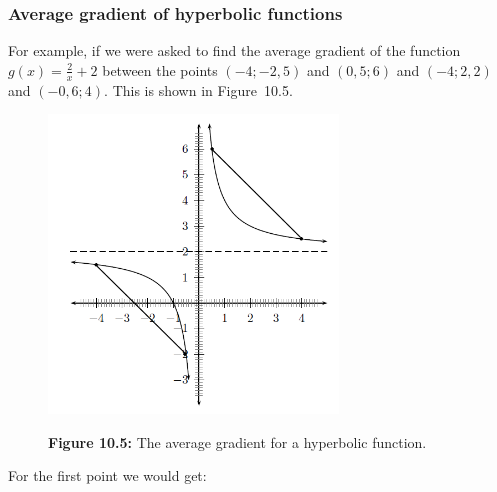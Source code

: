             \subsubsection{ Average gradient of hyperbolic functions}
            \nopagebreak
\label{m39223*id67324}For example, if we were asked to find the average gradient of the function $g\left(x\right)=\frac{2}{x}+2$ between the points $\left(-4;-2,5\right)$ and $\left(0,5;6\right)$ and $\left(-4;2,2\right)$ and $\left(-0,6;4\right)$. This is shown in Figure~10.5.
    \setcounter{subfigure}{0}
	\begin{figure}[H] %
    \begin{center}
    \label{m39223*uid32!!!underscore!!!media}\label{m39223*uid32!!!underscore!!!printimage}\includegraphics[height=300px]{col11306.imgs/m39223_hyperbola.png} %
      \vspace{2pt}
    \vspace{\rubberspace}\par \begin{cnxcaption}
	  \small \textbf{Figure 10.5: }The average gradient for a hyperbolic function.
	\end{cnxcaption}
    \vspace{.1in}
    \end{center}
 \end{figure}       \par 
\label{m39223*id2322} For the first point we would get:
 \label{m39223*id196486}\nopagebreak\noindent{}
